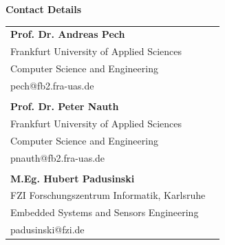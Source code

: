 {%
\begin{titlepage}
	\vspace*{\fill}
    \begin{center}
    {\Large\textbf{Contact Details}} \\ \vspace{4em}
    \begin{tabular}{@{}ll@{}}
    \textbf{Prof. Dr. Andreas Pech} & \\
    Frankfurt University of Applied Sciences & \\
    Computer Science and Engineering & \\
    pech@fb2.fra-uas.de & \\
    \vspace{0.5em} \\
    \textbf{Prof. Dr. Peter Nauth} & \\
    Frankfurt University of Applied Sciences & \\
    Computer Science and Engineering & \\
    pnauth@fb2.fra-uas.de & \\
    \vspace{0.5em} \\
    \textbf{M.Eg. Hubert Padusinski} & \\
    FZI Forschungszentrum Informatik, Karlsruhe & \\
    Embedded Systems and Sensors Engineering & \\
    padusinski@fzi.de & \\
    \end{tabular}
    \end{center}
    \vspace*{\fill}
\end{titlepage}

}
